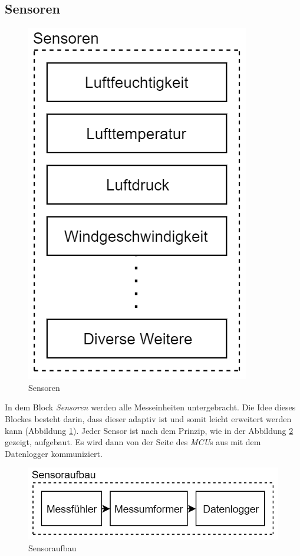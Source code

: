 \subsection{Sensoren}
\begin{figure}[h]
\centering
\includegraphics[scale=0.8]{graphics/Sensoren.PNG}
\caption{Sensoren}
\label{fig:sensoren}
\end{figure}
In dem Block \textit{Sensoren} werden alle Messeinheiten untergebracht. Die Idee dieses Blockes besteht darin, dass dieser adaptiv ist und somit leicht erweitert werden kann (Abbildung \ref{fig:sensoren}). Jeder Sensor ist nach dem Prinzip, wie in der Abbildung \ref{fig:sensoraufbau} gezeigt, aufgebaut. Es wird dann von der Seite des \textit{MCU}s aus mit dem Datenlogger kommuniziert.\\

\begin{figure}[h]
\centering
\includegraphics[scale=0.7]{graphics/Sensoraufbau.PNG}
\caption{Sensoraufbau}
\label{fig:sensoraufbau}
\end{figure}

